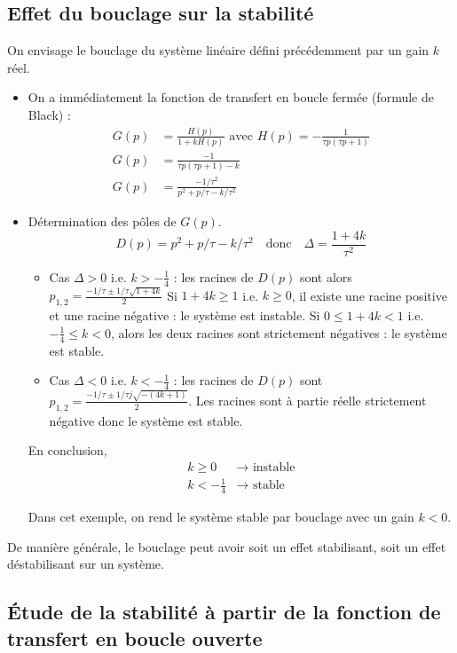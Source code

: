 \documentclass[../../Cours_M1.tex]{subfiles}
\begin{document}
\subsection*{Effet du bouclage sur la stabilité}
On envisage le bouclage du système linéaire défini précédemment par un gain $k$ réel.

\begin{itemize}
\item On a immédiatement la fonction de transfert en boucle fermée (formule de Black) :
\begin{align*}
G(p) & = \frac{H(p)}{1+kH(p)} \text{ avec } H(p) = -\frac{1}{\tau p (\tau p +1)} \\
G(p) & = \frac{-1}{\tau p (\tau p + 1) - k} \\
G(p) & = \frac{-1/\tau^2}{p^2 + p/\tau - k/\tau^2}
\end{align*}

\item Détermination des pôles de $G(p)$.
\[D(p) = p^2 + p/\tau - k/\tau^2 \quad \text{donc} \quad \Delta = \frac{1+4k}{\tau^2}\]
\begin{itemize}
\item Cas $\Delta > 0$ i.e. $k>-\frac{1}{4}$ : les racines de $D(p)$ sont alors $p_{1,2} = \frac{-1/\tau \pm 1/\tau \sqrt{1+4k}}{2}$
Si $1+4k \geq 1$ i.e. $k\geq0$, il existe une racine positive et une racine négative : le système est instable.
Si $0 \leq 1+4k < 1$ i.e. $-\frac{1}{4} \leq k < 0$, alors les deux racines sont strictement négatives : le système est stable.
\item Cas $\Delta < 0$ i.e. $k < -\frac{1}{4}$ : les racines de $D(p)$ sont $p_{1,2} = \frac{-1/\tau \pm 1/\tau j \sqrt{-(4k+1)}}{2}$.
Les racines sont à partie réelle strictement négative donc le système est stable.
\end{itemize}
En conclusion,
\begin{align*}
k \geq 0 & \rightarrow \text{ instable} \\
k < -\frac{1}{4} & \rightarrow \text{ stable}
\end{align*} 

Dans cet exemple, on rend le système stable par bouclage avec un gain $k<0$.
\end{itemize}

\medskip

\noindent De manière générale, le bouclage peut avoir soit un effet stabilisant, soit un effet déstabilisant sur un système.

\subsection*{Étude de la stabilité à partir de la fonction de transfert en boucle ouverte}
\end{document}
